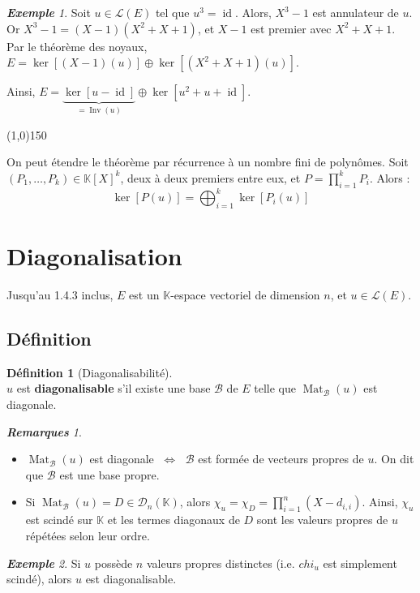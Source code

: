 \documentclass[12pt]{book}
\let\ensembleNombre\mathbb
\newcommand*\K{\ensuremath{\ensembleNombre{K}}}
\DeclareMathOperator{\id}{id}
\DeclareMathOperator{\Mat}{Mat}
\DeclareMathOperator{\Inv}{Inv}
\newcommand{\hr}{\begin{center}
					\line(1,0){150}
 				 \end{center}}
\theoremstyle{definition}
\newtheorem*{defi}{Définition}
\theoremstyle{remark}
\newtheorem*{rems}{\textbf{Remarques}}
\newtheorem*{ex}{\textbf{Exemple}}
\newenvironment{fdef}
  {\begin{mdframed}[roundcorner=10pt, linewidth=1pt]\begin{defi}}
  {\end{defi}\end{mdframed}}
\begin{document}
	\begin{ex}
	Soit $u \in \mathcal L(E)$ tel que $u^3 = \id$. Alors, $X^3 - 1$ est annulateur de $u$. Or $X^3 - 1 = (X-1)(X^2 + X + 1)$, et $X-1$ est premier avec $X^2 + X + 1$. Par le théorème des noyaux, $E = \ker [(X-1)(u)] \oplus \ker [(X^2 + X + 1)(u)]$.
	
	Ainsi, $\boxed{E = \underbrace{\ker[u - \id]}_{= \Inv(u)} \oplus \ker [u^2 + u + \id].}$
	\end{ex}
	
\hr
	
	On peut étendre le théorème par récurrence à un nombre fini de polynômes. Soit $(P_1, \ldots, P_k) \in \K[X]^k$, deux à deux premiers entre eux, et $P = \prod_{i=1}^k P_i$. Alors :
	\[ \boxed{ \ker[P(u)] = \bigoplus_{i=1}^k \ker [P_i(u)] }\]
	
	\section{Diagonalisation}
	Jusqu'au 1.4.3 inclus, $E$ est un $\K$-espace vectoriel de dimension $n$, et $u \in \mathcal L(E)$.
	
	\subsection{Définition}
	\begin{fdef}[Diagonalisabilité] \mbox{~}\\
	$u$ est \textbf{diagonalisable} s'il existe une base $\mathcal B$ de $E$ telle que $\Mat_{\mathcal B}(u)$ est diagonale.
	\end{fdef}
	
	\begin{rems}\mbox{~}\\
		\begin{itemize}
		\item $\Mat_{\mathcal B}(u)$ est diagonale $\;\Longleftrightarrow\;$ $\mathcal B$ est formée de vecteurs propres de $u$. On dit que $\mathcal B$ est une base propre.
		\item Si $\Mat_{\mathcal B}(u) = D \in \mathcal D_n(\K)$, alors $\chi_u = \chi_D = \prod_{i=1}^n (X - d_{i,i})$. Ainsi, $\chi_u$ est scindé sur $\K$ et les termes diagonaux de $D$ sont les valeurs propres de $u$ répétées selon leur ordre.
		\end{itemize}
	\end{rems}
	
	\begin{ex}
	Si $u$ possède $n$ valeurs propres distinctes (i.e. $chi_u$ est simplement scindé), alors $u$ est diagonalisable.
	\end{ex}
	
\end{document}

